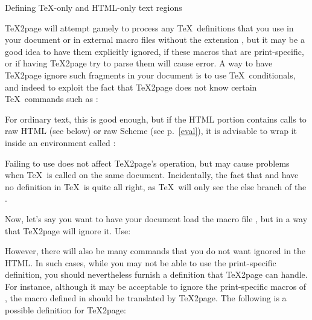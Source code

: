 \beginsection Defining \TeX-only and HTML-only text regions

\TeX2page will attempt gamely to process any \TeX\
definitions that you use in your document or in
external macro files without the extension ,
but it may be a good idea to have them explicitly
ignored, if these
macros that are print-specific, or if
having \TeX2page try to parse them will cause error.  A way
to have \TeX2page ignore such fragments in your document
is  to use
\TeX\ conditionals, and indeed to exploit the
fact that \TeX2page does not know certain \TeX\ commands
such as \p{\shipout}:


\n For ordinary text, this is good enough, but
if the HTML portion contains calls to raw HTML (see
below) or raw
Scheme (see p.~\ref{eval}), it is advisable to wrap it inside
an environment called
\p{\htmlonly}:


\n Failing to use \p{\htmlonly} does not affect
\TeX2page’s operation, but may cause problems when \TeX\
is called on the same document.
Incidentally, the fact that \p{\htmlonly} and \p{\endhtmlonly}
have no definition in \TeX\ is quite all right, as \TeX\
will only see the else branch of the \p{\ifx}.

Now, let’s say you want to have  your document load the macro file
\p{manmac.tex}, but in a way that \TeX2page will ignore
it.  Use:

\index{input@\p{}}
\p{
\ifx\shipout\UnDeFiNeD
\else
  
\fi
}

\n However, there will also be many  commands that
you do not want ignored in the HTML.  In such
cases, while you may not be able to use the print-specific
definition, you should nevertheless furnish a definition that \TeX2page
can handle.  For instance, although it may be acceptable
to ignore the print-specific macros of \p{manmac}, the
\p{\bull} macro defined in \p{manmac} should be
translated by \TeX2page.  The following is a possible
definition for \TeX2page:

\index{def@\p{\def}}
\p{
\def\bull{{\bf *}}
}


